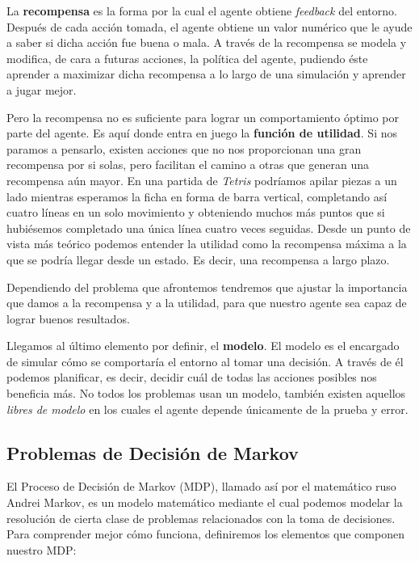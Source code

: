 La \textbf{recompensa} es la forma por la cual el agente obtiene \textit{feedback} del entorno. Después de cada acción tomada, el agente obtiene un valor numérico que le ayude a saber si dicha acción fue buena o mala. A través de la recompensa se modela y modifica, de cara a futuras acciones, la política del agente, pudiendo éste aprender a maximizar dicha recompensa a lo largo de una simulación y aprender a jugar mejor.

Pero la recompensa no es suficiente para lograr un comportamiento óptimo por parte del agente. Es aquí donde entra en juego la \textbf{función de utilidad}. Si nos paramos a pensarlo, existen acciones que no nos proporcionan una gran recompensa por si solas, pero facilitan el camino a otras que generan una recompensa aún mayor. En una partida de \textit{Tetris} podríamos apilar piezas a un lado mientras esperamos la ficha en forma de barra vertical, completando así cuatro líneas en un solo movimiento y obteniendo muchos más puntos que si hubiésemos completado una única línea cuatro veces seguidas. Desde un punto de vista más teórico podemos entender la utilidad como la recompensa máxima a la que se podría llegar desde un estado. Es decir, una recompensa a largo plazo.

Dependiendo del problema que afrontemos tendremos que ajustar la importancia que damos a la recompensa y a la utilidad, para que nuestro agente sea capaz de lograr buenos resultados.

Llegamos al último elemento por definir, el \textbf{modelo}. El modelo es el encargado de simular cómo se comportaría el entorno al tomar una decisión. A través de él podemos planificar, es decir, decidir cuál de todas las acciones posibles nos beneficia más. No todos los problemas usan un modelo, también existen aquellos \textit{libres de modelo} en los cuales el agente depende únicamente de la prueba y error. 

\subsection{Problemas de Decisión de Markov}
\label{sec:mdp}
El Proceso de Decisión de Markov (MDP), llamado así por el matemático ruso Andrei Markov, es un modelo matemático mediante el cual podemos modelar la resolución de cierta clase de problemas relacionados con la toma de decisiones. Para comprender mejor cómo funciona, definiremos los elementos que componen nuestro MDP:

